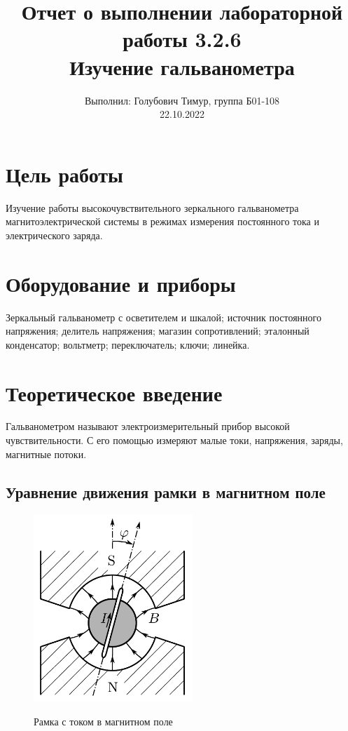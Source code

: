\documentclass[12pt,a4paper]{article}
\author{\normalsize Выполнил: Голубович Тимур, группа Б01-108 \\
	\normalsize 22.10.2022}
\date{}
\title{
	\large Отчет о выполнении лабораторной работы 3.2.6 \\
	\Large Изучение гальванометра \\ 
	
}
\begin{document}
	\maketitle
	
\section*{Цель работы}
Изучение работы высокочувствительного зеркального гальванометра магнитоэлектрической системы в режимах измерения постоянного тока и электрического заряда.

\section*{Оборудование и приборы} 
Зеркальный гальванометр с осветителем и шкалой;
источник постоянного напряжения;
делитель напряжения;
магазин сопротивлений;
эталонный конденсатор;
вольтметр;
переключатель;
ключи;
линейка.
	
	
	
	
\section*{Теоретическое введение}

	Гальванометром называют электроизмерительный прибор высокой чувствительности. С его помощью измеряют малые токи, напряжения, заряды, магнитные потоки.
	
\subsection*{Уравнение движения рамки в магнитном поле}

	\begin{figure}[h!]
    	\centering
    	\includegraphics[width=6cm]{res/frame.png}
    	\label{fig:f}
    	\caption{Рамка с током в магнитном поле}
    \end{figure}
	
\end{document}
